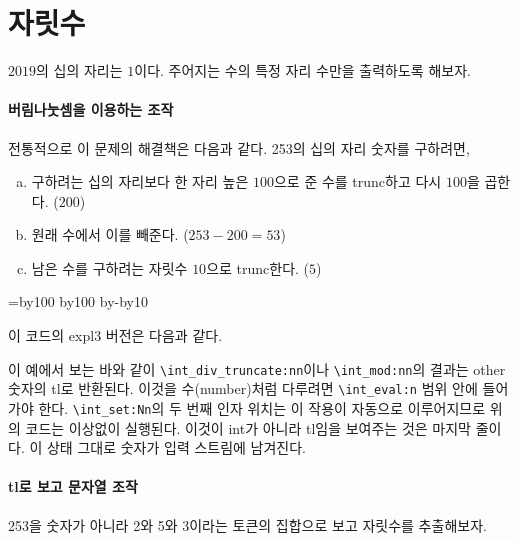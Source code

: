 \documentclass[a4paper,amsmath]{oblivoir}
\begin{document}
\section{자릿수}

$2019$의 십의 자리는 $1$이다. 주어지는 수의 특정 자리 수만을 출력하도록 해보자.

\paragraph{버림나눗셈을 이용하는 조작}

전통적으로 이 문제의 해결책은 다음과 같다. 253의 십의 자리 숫자를 구하려면,
\begin{enumerate}[(a)] \firmlist
\item 구하려는 십의 자리보다 한 자리 높은 $100$으로 준 수를 trunc하고 다시 $100$을 곱한다. ($200$)
\item 원래 수에서 이를 빼준다. ($253-200=53$)
\item 남은 수를 구하려는 자릿수 $10$으로 trunc한다. ($5$)
\end{enumerate}

\begin{examplebelow}
\newcount\m\newcount\n
{} \m=\n \divide\m by100 \multiply\m by100
\advance\n by-\m \divide\n by10 \the\n
\end{examplebelow}

이 코드의 expl3 버전은 다음과 같다.

이 예에서 보는 바와 같이 \verb|\int_div_truncate:nn|이나 \verb|\int_mod:nn|의 결과는 other 숫자의 tl로 반환된다. 이것을 수(number)처럼 다루려면 \verb|\int_eval:n| 범위 안에 들어가야 한다. \verb|\int_set:Nn|의 두 번째 인자 위치는 이 작용이 자동으로 이루어지므로 위의 코드는 이상없이 실행된다. 이것이 int가 아니라 tl임을 보여주는 것은 마지막 줄이다. 이 상태 그대로 숫자가 입력 스트림에 남겨진다.

\paragraph{tl로 보고 문자열 조작}

253을 숫자가 아니라 2와 5와 3이라는 토큰의 집합으로 보고 자릿수를 추출해보자. 
\end{document}
